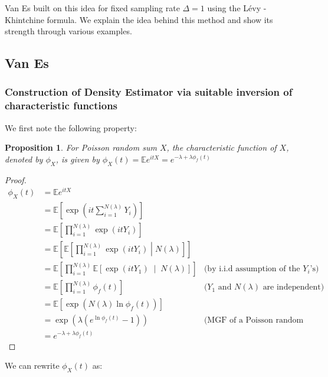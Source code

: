 \documentclass[a4paper,11pt]{article}
\theoremstyle{theorem}
\newtheorem{prop}{Proposition}[section]
\theoremstyle{definition}
\providecommand{\E}{\mathbb{E}}
\begin{document}
Van Es built on this idea for fixed sampling rate $\Delta = 1$ using the L\'{e}vy - Khintchine formula. We explain the idea behind this method and show its strength through various examples.

\subsection{Van Es}

\subsubsection{Construction of Density Estimator via suitable inversion of characteristic functions}

We first note the following property:

\begin{prop} \label{characteristicPS}
For Poisson random sum $X$, the characteristic function of $X$, denoted by $\phi_{X}$, is given by $\phi_X(t) = \mathbb{E}e^{itX} = e^{-\lambda + \lambda \phi_{f}(t)}$ 
\end{prop}

\begin{proof}
\begin{align*}
\phi_{X}(t) &= \E e^{itX} \\
          &= \E \left[ \exp\left(it\sum_{i=1}^{N(\lambda)}{Y_{i}}\right)\right] \\
          &= \E \left[ \prod_{i=1}^{N(\lambda)}{\exp(itY_{i})} \right] \\
          &= \E \left[ \E \left[ \prod_{i=1}^{N(\lambda)}{\exp(itY_{i})} \middle| N(\lambda) \right] \right] \\
          &= \E \left[ \prod_{i=1}^{N(\lambda)}{\E \left[ \exp(itY_{1}) \;\middle|\; N(\lambda) \right]} \right] & \text{(by i.i.d assumption of the } Y_{i}\text{'s)}  \\
          &= \E \left[ \prod_{i=1}^{N(\lambda)}{\phi_{f}(t)} \right] & \text{(}Y_{1} \text{ and } N(\lambda) \text{ are independent)} \\
          &= \E \left[ \exp(N(\lambda) \ln\phi_{f}(t)) \right] \\
          &= \exp(\lambda(e^{\ln\phi_{f}(t)} - 1)) & \text{(MGF of a Poisson random variable)} \\
          &= e^{-\lambda + \lambda \phi_{f}(t)}
\end{align*}
\end{proof}

We can rewrite $\phi_{X}(t)$ as:
\end{document}
